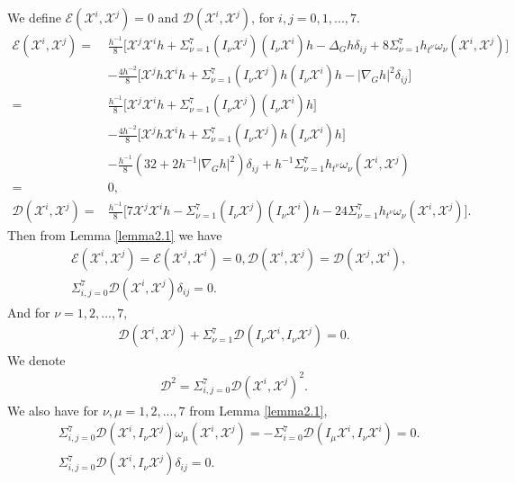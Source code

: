 \documentclass[reqno,12pt]{amsart}
\numberwithin{equation}{section}
\theoremstyle{plain}
\theoremstyle{definition}
\begin{document}
We define $\mathcal{E}(\mathscr{X}^i,\mathscr{X}^j)=0$  and $\mathcal{D}(\mathscr{X}^i,\mathscr{X}^j)$, for $i,j =0,1,...,7.$
\begin{align*}
   \mathcal{E}(\mathscr{X}^i,\mathscr{X}^j)=&\frac{h^{-1}}{8}\bigg[\mathscr{X}^j\mathscr{X}^ih+\Sigma_{\nu=1}^7(I_\nu \mathscr{X}^j)(I_\nu \mathscr{X}^i) h-\Delta_G h \delta_{ij}+8\Sigma_{\nu=1}^7h_{t^\nu}\omega_\nu(\mathscr{X}^i,\mathscr{X}^j)\bigg]\\&-\frac{4h^{-2}}{8}\bigg[\mathscr{X}^jh\mathscr{X}^ih+\Sigma_{\nu=1}^7(I_\nu \mathscr{X}^j)h(I_\nu \mathscr{X}^i) h-|\nabla_G h|^2\delta_{ij}\bigg]\\
   =&\frac{h^{-1}}{8}\bigg[\mathscr{X}^j\mathscr{X}^ih+\Sigma_{\nu=1}^7(I_\nu \mathscr{X}^j)(I_\nu \mathscr{X}^i) h\bigg]\\&-\frac{4h^{-2}}{8}\bigg[\mathscr{X}^jh\mathscr{X}^ih+\Sigma_{\nu=1}^7(I_\nu \mathscr{X}^j)h(I_\nu \mathscr{X}^i) h\bigg]\\&
   -\frac{h^{-1}}{8}(32+2h^{-1}|\nabla_G h|^2)\delta_{ij}+h^{-1}\Sigma_{\nu=1}^7h_{t^\nu}\omega_\nu(\mathscr{X}^i,\mathscr{X}^j)\\=&0,\\
   \mathcal{D}(\mathscr{X}^i,\mathscr{X}^j)=&\frac{h^{-1}}{8}\bigg[7\mathscr{X}^j\mathscr{X}^ih-\Sigma_{\nu=1}^7(I_\nu \mathscr{X}^j)(I_\nu \mathscr{X}^i) h-24\Sigma_{\nu=1}^7h_{t^\nu}\omega_\nu(\mathscr{X}^i,\mathscr{X}^j)\bigg].
    \end{align*}
Then from Lemma \ref{lemma2.1} we have
\begin{equation}\label{3.3}
\begin{aligned}
     &\mathcal{E}(\mathscr{X}^i,\mathscr{X}^j)=\mathcal{E}(\mathscr{X}^j,\mathscr{X}^i)=0,\mathcal{D}(\mathscr{X}^i,\mathscr{X}^j)=\mathcal{D}(\mathscr{X}^j,\mathscr{X}^i),\\
     &\Sigma_{i,j=0}^7\mathcal{D}(\mathscr{X}^i,\mathscr{X}^j)\delta_{ij}=0.    \end{aligned}
\end{equation}
And for $\nu=1,2,...,7$,
\begin{align}\label{3.4}
    \mathcal{D}(\mathscr{X}^i,\mathscr{X}^j)+\Sigma_{\nu=1}^7\mathcal{D}(I_\nu \mathscr{X}^i,I_\nu \mathscr{X}^j)=0.
\end{align}
We denote 
    \begin{align}
        \mathcal{D}^2=\Sigma_{i,j=0}^7\mathcal{D}(\mathscr{X}^i,\mathscr{X}^j)^2.   \end{align}
We also have for $\nu,\mu=1,2,...,7$ from Lemma \ref{lemma2.1},
 \begin{equation}\label{3.6}
 \begin{aligned}
& \Sigma_{i,j=0}^7\mathcal{D}(\mathscr{X}^i,I_\nu \mathscr{X}^j)\omega_\mu(\mathscr{X}^i,\mathscr{X}^j)=-\Sigma_{i=0}^7\mathcal{D}(I_\mu \mathscr{X}^i, I_\nu \mathscr{X}^i)=0.\\&\Sigma_{i,j=0}^7\mathcal{D}(\mathscr{X}^i, I_\nu\mathscr{X}^j)\delta_{ij}=0.
 \end{aligned}
 \end{equation}
\end{document}
